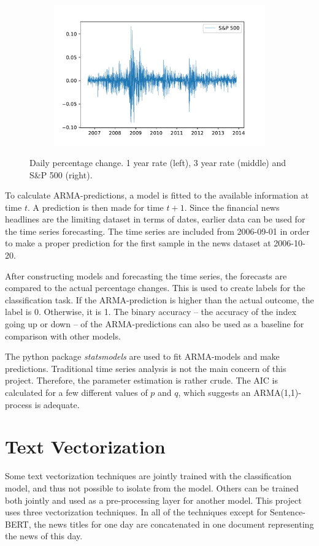 \begin{figure}[H]
\begin{subfigure}[b]{0.32\textwidth}
    \includegraphics[width=\textwidth]{Figures/sp_pct.pdf}
    \end{subfigure}
    \caption{Daily percentage change. 1 year rate (left), 3 year rate (middle) and S\&P 500 (right).}
    \label{fig:pct_ts}
\end{figure}

To calculate ARMA-predictions, a model is fitted to the available information at time $t$. A prediction is then made for time $t+1$. Since the financial news headlines are the limiting dataset in terms of dates, earlier data can be used for the time series forecasting. The time series are included from 2006-09-01 in order to make a proper prediction for the first sample in the news dataset at 2006-10-20. 

After constructing models and forecasting the time series, the forecasts are compared to the actual percentage changes. This is used to create labels for the classification task. If the ARMA-prediction is higher than the actual outcome, the label is 0. Otherwise, it is 1. 
The binary accuracy -- the accuracy of the index going up or down -- of the ARMA-predictions can also be used as a baseline for comparison with other models. 

The python package \emph{statsmodels} are used to fit ARMA-models and make predictions. Traditional time series analysis is not the main concern of this project. Therefore, the parameter estimation is rather crude. The AIC is calculated for a few different values of $p$ and $q$, which suggests an ARMA(1,1)-process is adequate. 

\section{Text Vectorization}
Some text vectorization techniques are jointly trained with the classification model, and thus not possible to isolate from the model. Others can be trained both jointly and used as a pre-processing layer for another model. This project uses three vectorization techniques. In all of the techniques except for Sentence-BERT, the news titles for one day are concatenated in one document representing the news of this day. 

